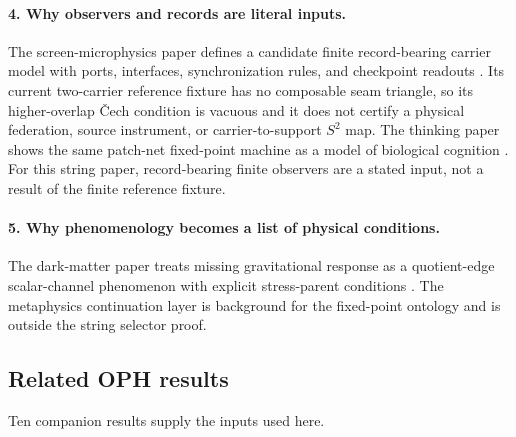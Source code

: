 \documentclass[11pt]{article}
\theoremstyle{remark}
\theoremstyle{plain}
\begin{document}
\paragraph{4. Why observers and records are literal inputs.}
The screen-microphysics paper defines a candidate finite record-bearing carrier model with ports,
interfaces, synchronization rules, and checkpoint readouts \cite{OPHScreenMicrophysics}. Its
current two-carrier reference fixture has no composable seam triangle, so its higher-overlap
\v{C}ech condition is vacuous and it does not certify a physical federation, source instrument,
or carrier-to-support \(S^2\) map. The thinking paper shows the same patch-net fixed-point machine
as a model of biological cognition \cite{OPHThinkingPatchNet}. For this string paper,
record-bearing finite observers are a stated input, not a result of the finite reference
fixture.

\paragraph{5. Why phenomenology becomes a list of physical conditions.}
The dark-matter paper treats missing gravitational response as a quotient-edge scalar-channel
phenomenon with explicit stress-parent conditions \cite{OPHDarkMatter}. The metaphysics continuation layer is background for the fixed-point
ontology and is outside the string selector proof.

\subsection{Related OPH results}

Ten companion results supply the inputs used here.
\end{document}
